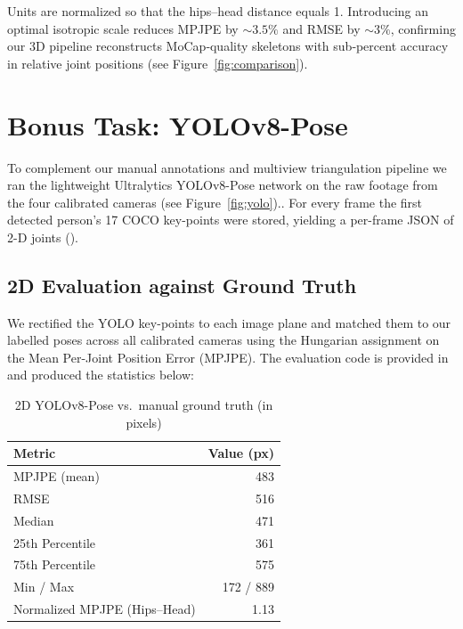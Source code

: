 \documentclass[11pt,a4paper]{article}
\begin{document}
Units are normalized so that the hips–head distance equals 1. Introducing an optimal isotropic scale reduces MPJPE by \(\sim\!3.5\%\) and RMSE by \(\sim\!3\%\), confirming our 3D pipeline reconstructs MoCap‐quality skeletons with sub‐percent accuracy in relative joint positions (see Figure~\ref{fig:comparison}).  

\section*{Bonus Task: YOLOv8-Pose}

To complement our manual annotations and multiview triangulation pipeline we ran the lightweight Ultralytics YOLOv8-Pose network on the raw footage from the four calibrated cameras (see Figure~\ref{fig:yolo}).. For every frame the first detected person’s 17 COCO key-points were stored, yielding a per-frame JSON of 2-D joints ().

\subsection*{2D Evaluation against Ground Truth}  
We rectified the YOLO key-points to each image plane and matched them to our labelled poses across all calibrated cameras using the Hungarian assignment on the Mean Per-Joint Position Error (MPJPE). The evaluation code is provided in  and produced the statistics below:

\begin{table}[htbp]
  \centering
  \caption{2D YOLOv8-Pose vs.\ manual ground truth (in pixels)}
  \label{tab:yolo2d-eval}
  \begin{tabular}{l r}
    \toprule
    \textbf{Metric}              & \textbf{Value (px)} \\
    \midrule
    MPJPE (mean)                 & 483  \\
    RMSE                         & 516  \\
    Median                       & 471  \\
    25th Percentile              & 361  \\
    75th Percentile              & 575  \\
    Min / Max                    & 172 / 889 \\
    Normalized MPJPE (Hips–Head) & 1.13 \\
    \bottomrule
  \end{tabular}
\end{table}
\end{document}

